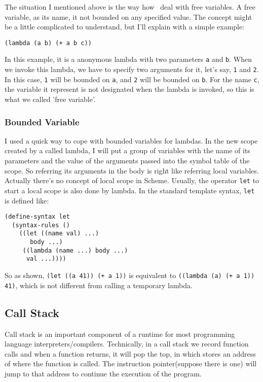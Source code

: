 The situation I mentioned above is the way how \revo\ deal with
free variables. A free variable, as its name, it not bounded on any
specified value. The concept might be a little complicated to
understand, but I'll explain with a simple example:
\begin{verbatim}
(lambda (a b) (+ a b c))
\end{verbatim}

In this example, it is a anonymous lambda with two parameters \verb+a+
and \verb+b+. When we invoke this lambda, we have to specify two
arguments for it, let's say, \verb+1+ and \verb+2+. In this case,
\verb+1+ will be bounded on \verb+a+, and \verb+2+ will be bounded on
\verb+b+. For the name \verb+c+, the variable it represent is not
designated when the lambda is invoked, so this is what we called 'free
variable'.

\subsubsection{Bounded Variable}
I used a quick way to cope with bounded variables for lambdas. In the
new scope created by a called lambda, I will put a group of variables
with the name of its parameters and the value of the arguments passed
into the symbol table of the scope. So referring its arguments in the
body is right like referring local variables. Actually there's no
concept of local scope in Scheme. Usually, the operator \verb+let+ to
start a local scope is also done by lambda. In the standard template
syntax, \verb+let+ is defined like:

\begin{verbatim}
(define-syntax let
  (syntax-rules ()
    ((let ((name val) ...)
       body ...)
     ((lambda (name ...) body ...)
      val ...))))
\end{verbatim}

So as shown, \verb^(let ((a 41)) (+ a 1))^ is equivalent to
\verb^((lambda (a) (+ a 1)) 41)^, which is not different from calling
a temporary lambda.

\subsection{Call Stack}
Call stack is an important component of a runtime for most programming
language interpreters/compilers. Technically, in a call stack we
record function calls and when a function returns, it will pop the
top, in which stores an address of where the function is called. The
instruction pointer(suppose there is one) will jump to that address to
continue the execution of the program.

